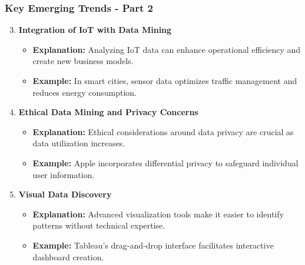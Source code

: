 \documentclass[aspectratio=169]{beamer}
\begin{document}
\begin{frame}[fragile]
    \frametitle{Key Emerging Trends - Part 2}
    \begin{enumerate}
        \setcounter{enumi}{2}
        \item \textbf{Integration of IoT with Data Mining}
            \begin{itemize}
                \item \textbf{Explanation:} Analyzing IoT data can enhance operational efficiency and create new business models.
                \item \textbf{Example:} In smart cities, sensor data optimizes traffic management and reduces energy consumption.
            \end{itemize}
        
        \item \textbf{Ethical Data Mining and Privacy Concerns}
            \begin{itemize}
                \item \textbf{Explanation:} Ethical considerations around data privacy are crucial as data utilization increases.
                \item \textbf{Example:} Apple incorporates differential privacy to safeguard individual user information.
            \end{itemize}
        
        \item \textbf{Visual Data Discovery}
            \begin{itemize}
                \item \textbf{Explanation:} Advanced visualization tools make it easier to identify patterns without technical expertise.
                \item \textbf{Example:} Tableau's drag-and-drop interface facilitates interactive dashboard creation.
            \end{itemize}
    \end{enumerate}
\end{frame}
\end{document}
